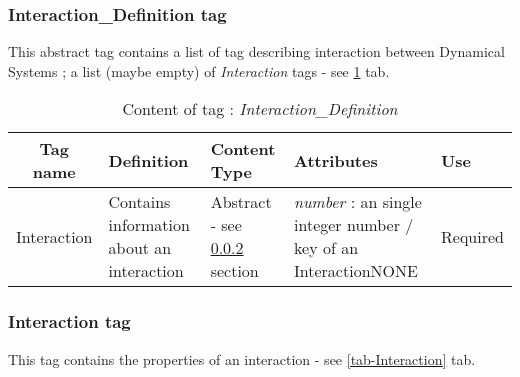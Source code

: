 \subsubsection{Interaction\_Definition tag}
\label{InteractionDefinitionTag}

This abstract tag contains a list of tag describing interaction between Dynamical Systems ; a list (maybe empty) of \textit{Interaction} tags - see \ref{tab-IDefinition} tab.\\

\begin{table}[!hbp]
\begin{center}
\begin{tabular}{|c|p{6cm}|p{2cm}|p{3cm}|p{2cm}|}
\hline
\bf{Tag name} & \bf{Definition} & \bf{Content Type} & \bf{Attributes} & \bf{Use}
\\\hline
\hline
Interaction		  & Contains information about an interaction & Abstract - see \ref{InteractionTag} section& \textit{number} : an single integer number / key of an InteractionNONE &  Required\\
\hline
\end{tabular}
\end{center}
\caption{Content of tag : \textit{Interaction\_Definition}}
\label{tab-IDefinition}
\end{table}



\subsubsection{Interaction tag}
\label{InteractionTag}
This tag contains the properties of an interaction - see \ref{tab-Interaction} tab.\\

